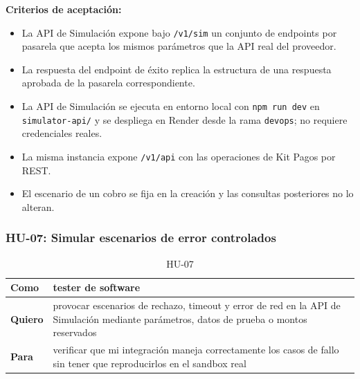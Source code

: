 \textbf{Criterios de aceptación:}
\begin{itemize}
  \item La API de Simulación expone bajo \texttt{/v1/sim} un conjunto de endpoints por pasarela que acepta los mismos parámetros que la API real del proveedor.
  \item La respuesta del endpoint de éxito replica la estructura de una respuesta aprobada de la pasarela correspondiente.
  \item La API de Simulación se ejecuta en entorno local con \texttt{npm run dev} en \texttt{simulator-api/} y se despliega en Render desde la rama \texttt{devops}; no requiere credenciales reales.
  \item La misma instancia expone \texttt{/v1/api} con las operaciones de Kit Pagos por REST.
  \item El escenario de un cobro se fija en la creación y las consultas posteriores no lo alteran.
\end{itemize}

\subsubsection{HU-07: Simular escenarios de error controlados}
\begin{table}[H]
  \centering
  \renewcommand{\arraystretch}{1.2}
  \begin{tabularx}{\textwidth}{|l|X|}
    \hline
    \textbf{Como} & tester de software \\
    \hline
    \textbf{Quiero} & provocar escenarios de rechazo, timeout y error de red en la API de Simulación mediante parámetros, datos de prueba o montos reservados \\
    \hline
    \textbf{Para} & verificar que mi integración maneja correctamente los casos de fallo sin tener que reproducirlos en el sandbox real \\
    \hline
  \end{tabularx}
  \caption{HU-07}
  \label{tab:hu-07}
\end{table}

